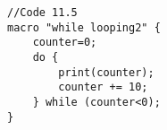 \begin{lstlisting}[morekeywords={*, while}]
//Code 11.5
macro "while looping2" {
	counter=0;
	do {
		print(counter);
		counter += 10;
	} while (counter<0); 
}

\end{lstlisting}